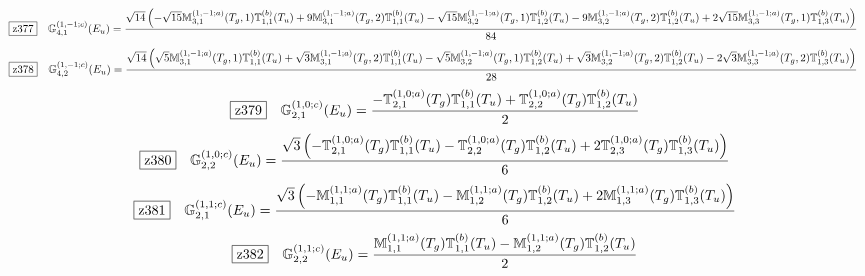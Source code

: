 \documentclass[fleqn,10pt,landscape]{jsarticle}
\begin{document}
\begin{dmath*}
\hspace*{3mm}\fbox{z377}\quad \mathbb{G}_{4,1}^{(1,-1;c)}(E_{u})=\frac{\sqrt{14} \left(- \sqrt{15} \mathbb{M}_{3,1}^{(1,-1;a)}(T_{g},1) \mathbb{T}_{1,1}^{(b)}(T_{u}) + 9 \mathbb{M}_{3,1}^{(1,-1;a)}(T_{g},2) \mathbb{T}_{1,1}^{(b)}(T_{u}) - \sqrt{15} \mathbb{M}_{3,2}^{(1,-1;a)}(T_{g},1) \mathbb{T}_{1,2}^{(b)}(T_{u}) - 9 \mathbb{M}_{3,2}^{(1,-1;a)}(T_{g},2) \mathbb{T}_{1,2}^{(b)}(T_{u}) + 2 \sqrt{15} \mathbb{M}_{3,3}^{(1,-1;a)}(T_{g},1) \mathbb{T}_{1,3}^{(b)}(T_{u})\right)}{84}
\end{dmath*}
\begin{dmath*}
\hspace*{3mm}\fbox{z378}\quad \mathbb{G}_{4,2}^{(1,-1;c)}(E_{u})=\frac{\sqrt{14} \left(\sqrt{5} \mathbb{M}_{3,1}^{(1,-1;a)}(T_{g},1) \mathbb{T}_{1,1}^{(b)}(T_{u}) + \sqrt{3} \mathbb{M}_{3,1}^{(1,-1;a)}(T_{g},2) \mathbb{T}_{1,1}^{(b)}(T_{u}) - \sqrt{5} \mathbb{M}_{3,2}^{(1,-1;a)}(T_{g},1) \mathbb{T}_{1,2}^{(b)}(T_{u}) + \sqrt{3} \mathbb{M}_{3,2}^{(1,-1;a)}(T_{g},2) \mathbb{T}_{1,2}^{(b)}(T_{u}) - 2 \sqrt{3} \mathbb{M}_{3,3}^{(1,-1;a)}(T_{g},2) \mathbb{T}_{1,3}^{(b)}(T_{u})\right)}{28}
\end{dmath*}
\begin{dmath*}
\hspace*{3mm}\fbox{z379}\quad \mathbb{G}_{2,1}^{(1,0;c)}(E_{u})=\frac{- \mathbb{T}_{2,1}^{(1,0;a)}(T_{g}) \mathbb{T}_{1,1}^{(b)}(T_{u}) + \mathbb{T}_{2,2}^{(1,0;a)}(T_{g}) \mathbb{T}_{1,2}^{(b)}(T_{u})}{2}
\end{dmath*}
\begin{dmath*}
\hspace*{3mm}\fbox{z380}\quad \mathbb{G}_{2,2}^{(1,0;c)}(E_{u})=\frac{\sqrt{3} \left(- \mathbb{T}_{2,1}^{(1,0;a)}(T_{g}) \mathbb{T}_{1,1}^{(b)}(T_{u}) - \mathbb{T}_{2,2}^{(1,0;a)}(T_{g}) \mathbb{T}_{1,2}^{(b)}(T_{u}) + 2 \mathbb{T}_{2,3}^{(1,0;a)}(T_{g}) \mathbb{T}_{1,3}^{(b)}(T_{u})\right)}{6}
\end{dmath*}
\begin{dmath*}
\hspace*{3mm}\fbox{z381}\quad \mathbb{G}_{2,1}^{(1,1;c)}(E_{u})=\frac{\sqrt{3} \left(- \mathbb{M}_{1,1}^{(1,1;a)}(T_{g}) \mathbb{T}_{1,1}^{(b)}(T_{u}) - \mathbb{M}_{1,2}^{(1,1;a)}(T_{g}) \mathbb{T}_{1,2}^{(b)}(T_{u}) + 2 \mathbb{M}_{1,3}^{(1,1;a)}(T_{g}) \mathbb{T}_{1,3}^{(b)}(T_{u})\right)}{6}
\end{dmath*}
\begin{dmath*}
\hspace*{3mm}\fbox{z382}\quad \mathbb{G}_{2,2}^{(1,1;c)}(E_{u})=\frac{\mathbb{M}_{1,1}^{(1,1;a)}(T_{g}) \mathbb{T}_{1,1}^{(b)}(T_{u}) - \mathbb{M}_{1,2}^{(1,1;a)}(T_{g}) \mathbb{T}_{1,2}^{(b)}(T_{u})}{2}
\end{dmath*}
\end{document}
